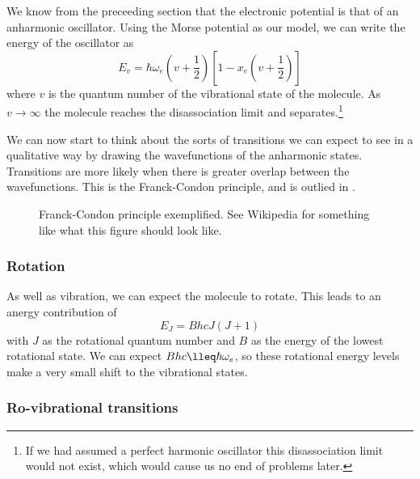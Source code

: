 We know from the preceeding section that the electronic potential is that of an
anharmonic oscillator. Using the Morse potential  as our model, we
can write the energy of the oscillator as
%
\begin{equation}
  E_v = \hbar \omega_e (v + \frac{1}{2})[1 - x_e(v+\frac{1}{2})]
\end{equation}
%
 where $v$ is the quantum number of the
vibrational state of the molecule. As $v \rightarrow \infty $ the molecule
reaches the disassociation limit and separates.\footnote{If we had assumed a
perfect harmonic oscillator this disassociation limit would not exist, which
would cause us no end of problems later.} 

We can now start to think about the sorts of transitions we can expect to see in
a qualitative way by drawing the wavefunctions of the anharmonic states.
Transitions are more likely  when there is greater overlap
between the wavefunctions. This is the Franck-Condon principle, and is outlied
in .

\begin{figure}
  \caption{Franck-Condon principle exemplified. See Wikipedia for something like
  what this figure should look like.}
  \label{diaspec:fig:franckcondon}
\end{figure}


\subsubsection{Rotation}

As well as vibration, we can expect the molecule to rotate. This leads to an
anergy contribution of 
%
\begin{equation}
  E_J = BhcJ(J+1)
\end{equation}
%
with $J$ as the rotational quantum number and $B$ as the energy of the lowest
rotational state. We can expect $Bhc \lleq \hbar\omega_e $, so these rotational
energy levels make a very small shift to the vibrational states.

\subsubsection{Ro-vibrational transitions}

